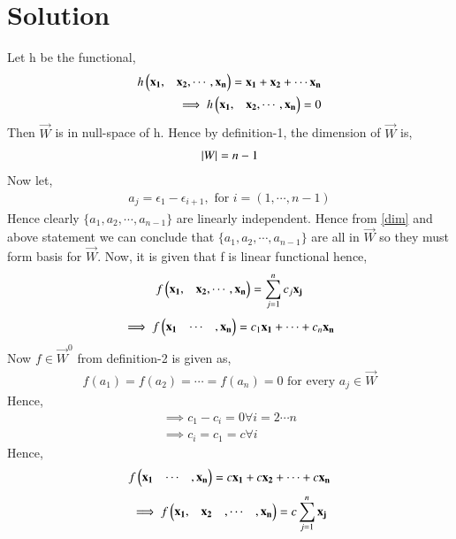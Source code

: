 \documentclass[journal,12pt,twocolumn]{IEEEtran}
\begin{document}
\section{Solution}
Let h be the functional,
\begin{align}
h\begin{pmatrix}\mathbf{x_1},&\mathbf{x_2},\cdots ,\mathbf{x_n}\end{pmatrix} = \mathbf{x_1}+\mathbf{x_2}+\cdots \mathbf{x_n}\\
\implies h\begin{pmatrix}\mathbf{x_1},&\mathbf{x_2},\cdots ,\mathbf{x_n}\end{pmatrix} = 0
\end{align}
Then $\vec{W}$ is in null-space of h. Hence by definition-1, the dimension of $\vec{W}$ is,
\begin{align}
\left\vert W\right\vert = n - 1
\label{dim}
\end{align}
Now let, 
\begin{align}
a_j = \epsilon_1-\epsilon_{i+1}, \mbox{ for } i = (1,\cdots ,n-1)
\label{aj} 
\end{align}
Hence clearly $\{a_1, a_2, \cdots, a_{n-1}\}$ are linearly independent. Hence from \eqref{dim} and above statement we can conclude that $\{a_1, a_2, \cdots, a_{n-1}\}$ are all in $\vec{W}$ so they must form basis for $\vec{W}$. Now, it is given that f is linear functional hence,
\begin{align}
f\begin{pmatrix}\mathbf{x_1},&\mathbf{x_2},\cdots ,\mathbf{x_n}\end{pmatrix} = \sum_{j=1}^{n}c_j\mathbf{x_j}
\end{align}
\begin{align}
\implies f\begin{pmatrix}\mathbf{x_1}&\cdots &,\mathbf{x_n}\end{pmatrix} = c_1\mathbf{x_1} + \cdots + c_n\mathbf{x_n}
\end{align}
Now $f \in \vec{W}^0$ from definition-2 is given as,
\begin{align}
f(a_1) = f(a_2) = \cdots = f(a_n) = 0 \mbox{ for every } a_j \in \vec{W}
\end{align}
Hence,
\begin{align}
\implies c_1 - c_i = 0 \forall i= 2\cdots n\\
\implies c_i = c_1 = c \forall i
\end{align}
Hence,
\begin{align}
f\begin{pmatrix}\mathbf{x_1}&\cdots &,\mathbf{x_n}\end{pmatrix} = c\mathbf{x_1} + c\mathbf{x_2} + \cdots + c\mathbf{x_n}
\end{align}
\begin{align}
\implies f\begin{pmatrix}\mathbf{x_1},&\mathbf{x_2}&,\cdots &,\mathbf{x_n}\end{pmatrix} = c\sum_{j=1}^{n}\mathbf{x_j}
\end{align}
\end{document}

